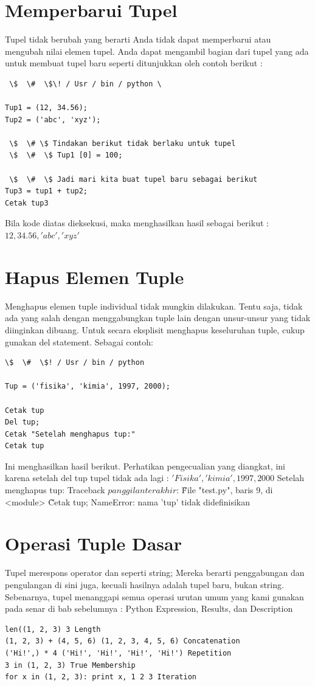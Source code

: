 \section{Memperbarui Tupel} 
Tupel tidak berubah yang berarti Anda tidak dapat memperbarui atau mengubah nilai elemen tupel. Anda dapat mengambil bagian dari tupel yang ada untuk membuat tupel baru seperti ditunjukkan oleh contoh berikut :
 \begin{verbatim}
 \$  \#  \$\! / Usr / bin / python \

Tup1 = (12, 34.56);
Tup2 = ('abc', 'xyz'); 

 \$  \# \$ Tindakan berikut tidak berlaku untuk tupel 
 \$  \#  \$ Tup1 [0] = 100; 

 \$  \#  \$ Jadi mari kita buat tupel baru sebagai berikut 
Tup3 = tup1 + tup2; 
Cetak tup3 
\end{verbatim}
Bila kode diatas dieksekusi, maka menghasilkan hasil sebagai berikut : 
\(12, 34.56, 'abc', 'xyz'\) 
\section{Hapus Elemen Tuple} 
Menghapus elemen tuple individual tidak mungkin dilakukan. Tentu saja, tidak ada yang salah dengan menggabungkan tuple lain dengan unsur-unsur yang tidak diinginkan dibuang. 
Untuk secara eksplisit menghapus keseluruhan tuple, cukup gunakan del statement. Sebagai contoh: 
\begin{verbatim}
\$  \#  \$! / Usr / bin / python 

Tup = ('fisika', 'kimia', 1997, 2000);

Cetak tup 
Del tup; 
Cetak "Setelah menghapus tup:" 
Cetak tup 
\end{verbatim}
Ini menghasilkan hasil berikut. Perhatikan pengecualian yang diangkat, ini karena setelah del tup tupel tidak ada lagi :
\('Fisika', 'kimia', 1997, 2000\) 
Setelah menghapus tup: 
Traceback \(panggilan terakhir\): 
\~ File "test.py", baris 9, di <module> 
\~ Cetak tup; 
NameError: nama 'tup' tidak didefinisikan 
\section{Operasi Tuple Dasar}
Tupel merespons operator \+ dan \* seperti string; Mereka berarti penggabungan dan pengulangan di sini juga, kecuali hasilnya adalah tupel baru, bukan string. 
Sebenarnya, tupel menanggapi semua operasi urutan umum yang kami gunakan pada senar di bab sebelumnya : 
Python Expression, Results, dan Description 
\begin{verbatim}
len((1, 2, 3) 3 Length 
(1, 2, 3) + (4, 5, 6) (1, 2, 3, 4, 5, 6) Concatenation 
('Hi!',) * 4 ('Hi!', 'Hi!', 'Hi!', 'Hi!') Repetition 
3 in (1, 2, 3) True Membership 
for x in (1, 2, 3): print x, 1 2 3 Iteration 
\end{verbatim}
